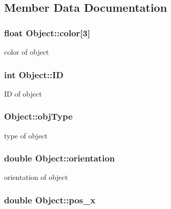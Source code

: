 \subsection{Member Data Documentation}
\hypertarget{classObject_a50e27dde92065fad6aa039f1af278c0b}{
\subsubsection[{color}]{\setlength{\rightskip}{0pt plus 5cm}float Object\-::color\mbox{[}3\mbox{]}\hspace{0.3cm}{\ttfamily [private]}}}\label{classObject_a50e27dde92065fad6aa039f1af278c0b}
color of object \hypertarget{classObject_a4a82b2bbd9ca66c55898ebf012134171}{
\subsubsection[{I\-D}]{\setlength{\rightskip}{0pt plus 5cm}int Object\-::\-I\-D\hspace{0.3cm}{\ttfamily [private]}}}\label{classObject_a4a82b2bbd9ca66c55898ebf012134171}
I\-D of object \hypertarget{classObject_afa7fbd7b761dfb5f3c930fc2cb21e953}{
\subsubsection[{obj\-Type}]{ Object\-::obj\-Type\hspace{0.3cm}{\ttfamily [private]}}}\label{classObject_afa7fbd7b761dfb5f3c930fc2cb21e953}
type of object \hypertarget{classObject_a0b91fc65d0880b7c6d47e185e6260f53}{
\subsubsection[{orientation}]{\setlength{\rightskip}{0pt plus 5cm}double Object\-::orientation\hspace{0.3cm}{\ttfamily [private]}}}\label{classObject_a0b91fc65d0880b7c6d47e185e6260f53}
orientation of object \hypertarget{classObject_a1f71a5693147aecc701db4ab51d3edcc}{
\subsubsection[{pos\-\_\-x}]{\setlength{\rightskip}{0pt plus 5cm}double Object\-::pos\-\_\-x\hspace{0.3cm}{\ttfamily [private]}}}\label{classObject_a1f71a5693147aecc701db4ab51d3edcc}
